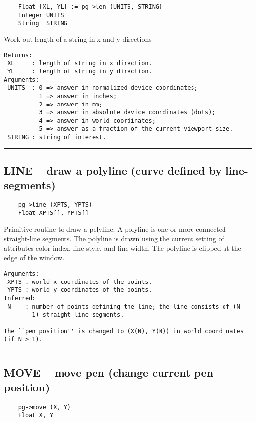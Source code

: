 \begin{verbatim}
    Float [XL, YL] := pg->len (UNITS, STRING)
    Integer UNITS
    String  STRING
\end{verbatim}

Work out length of a string in x and y directions

\begin{verbatim}
Returns:
 XL     : length of string in x direction.
 YL     : length of string in y direction.
Arguments:
 UNITS  : 0 => answer in normalized device coordinates;
          1 => answer in inches;
          2 => answer in mm;
          3 => answer in absolute device coordinates (dots);
          4 => answer in world coordinates;
          5 => answer as a fraction of the current viewport size.
 STRING : string of interest.
\end{verbatim}

\hrule

\subsection*{LINE -- draw a polyline (curve defined by line-segments) }

\begin{verbatim}
    pg->line (XPTS, YPTS)
    Float XPTS[], YPTS[]
\end{verbatim}

Primitive routine to draw a polyline.  A polyline is one or more
connected straight-line segments.  The polyline is drawn using the
current setting of attributes color-index, line-style, and line-width.
The polyline is clipped at the edge of the window.

\begin{verbatim}
Arguments:
 XPTS : world x-coordinates of the points.
 YPTS : world y-coordinates of the points.
Inferred:
 N    : number of points defining the line; the line consists of (N -
        1) straight-line segments.  

The ``pen position'' is changed to (X(N), Y(N)) in world coordinates
(if N > 1).
\end{verbatim}

\hrule

\subsection*{MOVE -- move pen (change current pen position) }

\begin{verbatim}
    pg->move (X, Y)
    Float X, Y
\end{verbatim}

